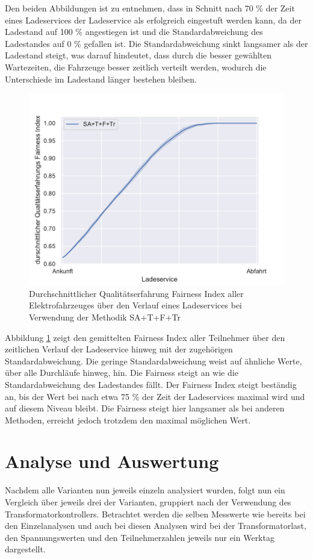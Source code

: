 Den beiden Abbildungen ist zu entnehmen, dass in Schnitt nach 70 \% der Zeit eines Ladeservices der Ladeservice als erfolgreich eingestuft werden kann, da der Ladestand auf 100 \% angestiegen ist und die Standardabweichung des Ladestandes auf 0 \% gefallen ist. Die Standardabweichung sinkt langsamer als der Ladestand steigt, was darauf hindeutet, dass durch die besser gewählten Wartezeiten, die Fahrzeuge besser zeitlich verteilt werden, wodurch die Unterschiede im Ladestand länger bestehen bleiben.\\
\begin{figure}[htb]
\centering
	\includegraphics[scale=0.45]{img/Sa_wT_trafo/SlottedAloha_waitingTime_VDE_tau_trafo_13_qoe.pdf}
	\caption{Durchschnittlicher Qualitätserfahrung Fairness Index aller Elektrofahrzeuges über den Verlauf eines Ladeservices bei Verwendung der Methodik SA+T+F+Tr}
	\label{Abb_SAwtTrafo_Fairness}
\end{figure}
Abbildung \ref{Abb_SAwtTrafo_Fairness} zeigt den gemittelten Fairness Index aller Teilnehmer über den zeitlichen Verlauf der Ladeservice hinweg mit der zugehörigen Standardabweichung. Die geringe Standardabweichung weist auf ähnliche Werte, über alle Durchläufe hinweg, hin. Die Fairness steigt an wie die Standardabweichung des Ladestandes fällt. Der Fairness Index steigt beständig an, bis der Wert bei nach etwa 75 \% der Zeit der Ladeservices maximal wird und auf diesem Niveau bleibt. Die Fairness steigt hier langsamer als bei anderen Methoden, erreicht jedoch trotzdem den maximal möglichen Wert.

\section{Analyse und Auswertung}
Nachdem alle Varianten nun jeweils einzeln analysiert wurden, folgt nun ein Vergleich über jeweils drei der Varianten, gruppiert nach der Verwendung des Transformatorkontrollers. Betrachtet werden die selben Messwerte wie bereits bei den Einzelanalysen und auch bei diesen Analysen wird bei der Transformatorlast, den Spannungswerten und den Teilnehmerzahlen jeweils nur ein Werktag dargestellt.
